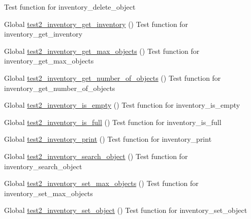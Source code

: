 \begin{DoxyRefList}
Test function for inventory\+\_\+delete\+\_\+object  
\item[Global \mbox{\hyperlink{inventory__test_8h_a800414ee6d964ee2424534f14a4dbda9}{test2\+\_\+inventory\+\_\+get\+\_\+inventory}} ()]\label{test__test000026}%
%
Test function for inventory\+\_\+get\+\_\+inventory  
\item[Global \mbox{\hyperlink{inventory__test_8h_ac75954611acab583f780145532ab3197}{test2\+\_\+inventory\+\_\+get\+\_\+max\+\_\+objects}} ()]\label{test__test000050}%
%
Test function for inventory\+\_\+get\+\_\+max\+\_\+objects  
\item[Global \mbox{\hyperlink{inventory__test_8h_afb66a921e4bd9b8df05b0c2fcbbc9649}{test2\+\_\+inventory\+\_\+get\+\_\+number\+\_\+of\+\_\+objects}} ()]\label{test__test000024}%
%
Test function for inventory\+\_\+get\+\_\+number\+\_\+of\+\_\+objects  
\item[Global \mbox{\hyperlink{inventory__test_8h_a4d2a2a4d4ba59446d013debfe9bf05dc}{test2\+\_\+inventory\+\_\+is\+\_\+empty}} ()]\label{test__test000036}%
%
Test function for inventory\+\_\+is\+\_\+empty  
\item[Global \mbox{\hyperlink{inventory__test_8h_a1c9e567d4919d5aaccc9580815a8a81d}{test2\+\_\+inventory\+\_\+is\+\_\+full}} ()]\label{test__test000039}%
%
Test function for inventory\+\_\+is\+\_\+full  
\item[Global \mbox{\hyperlink{inventory__test_8h_ab416dcaf2ae0f9852a8c6ed5eea4f408}{test2\+\_\+inventory\+\_\+print}} ()]\label{test__test000028}%
%
Test function for inventory\+\_\+print  
\item[Global \mbox{\hyperlink{inventory__test_8h_a1aeb71b051c56adb23f374997b3a7662}{test2\+\_\+inventory\+\_\+search\+\_\+object}} ()]\label{test__test000042}%
%
Test function for inventory\+\_\+search\+\_\+object  
\item[Global \mbox{\hyperlink{inventory__test_8h_aff93a7fb7ffbac1890ce563012a9d372}{test2\+\_\+inventory\+\_\+set\+\_\+max\+\_\+objects}} ()]\label{test__test000047}%
%
Test function for inventory\+\_\+set\+\_\+max\+\_\+objects  
\item[Global \mbox{\hyperlink{inventory__test_8h_ac6a46ad895e30089d52ed81d2f7d32c4}{test2\+\_\+inventory\+\_\+set\+\_\+object}} ()]\label{test__test000019}%
%
Test function for inventory\+\_\+set\+\_\+object  

\end{DoxyRefList}
